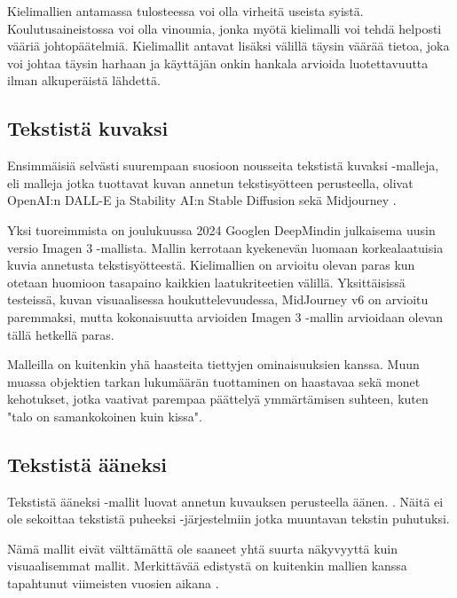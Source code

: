 Kielimallien antamassa tulosteessa voi olla virheitä useista syistä.
Koulutusaineistossa voi olla vinoumia, jonka myötä kielimalli voi tehdä
helposti vääriä johtopäätelmiä. Kielimallit antavat lisäksi välillä täysin
väärää tietoa, joka voi johtaa täysin harhaan ja käyttäjän onkin hankala
arvioida luotettavuutta ilman alkuperäistä lähdettä.
\parencite{akavaworksNakokulmiaTekoalyynOsa6}

\subsection{Tekstistä kuvaksi}

Ensimmäisiä selvästi suurempaan suosioon nousseita tekstistä kuvaksi -malleja,
eli malleja jotka tuottavat kuvan annetun tekstisyötteen perusteella, olivat
OpenAI:n DALL-E \parencite{openAIDallE} ja Stability AI:n Stable Diffusion
\parencite{stableDiffusionLaunch} sekä Midjourney
\parencite{twitter1547108864788553729}.

Yksi tuoreimmista on joulukuussa 2024 Googlen DeepMindin julkaisema uusin
versio Imagen 3 -mallista. Mallin kerrotaan kyekenevän luomaan korkealaatuisia
kuvia annetusta tekstisyötteestä. Kielimallien on arvioitu olevan paras kun
otetaan huomioon tasapaino kaikkien laatukriteetien välillä. Yksittäisissä
testeissä, kuvan visuaalisessa houkuttelevuudessa, MidJourney v6 on arvioitu
paremmaksi, mutta kokonaisuutta arvioiden Imagen 3 -mallin arvioidaan olevan
tällä hetkellä paras. \parencite{googleDeepmindImagen3_v3report}

Malleilla on kuitenkin yhä haasteita tiettyjen ominaisuuksien kanssa. Muun
muassa objektien tarkan lukumäärän tuottaminen on haastavaa sekä monet
kehotukset, jotka vaativat parempaa päättelyä ymmärtämisen suhteen, kuten
"talo on samankokoinen kuin kissa". \parencite{googleDeepmindImagen3_v3report}

\subsection{Tekstistä ääneksi}

Tekstistä ääneksi -mallit luovat annetun kuvauksen perusteella äänen.
\parencite{liu2023audioldmtexttoaudiogenerationlatent}. Näitä ei ole sekoittaa
tekstistä puheeksi -järjestelmiin jotka muuntavan tekstin puhutuksi.

Nämä mallit eivät välttämättä ole saaneet yhtä suurta näkyvyyttä kuin
visuaalisemmat mallit. Merkittävää edistystä on kuitenkin mallien kanssa
tapahtunut viimeisten vuosien aikana
\parencite{liu2023audioldmtexttoaudiogenerationlatent}.


